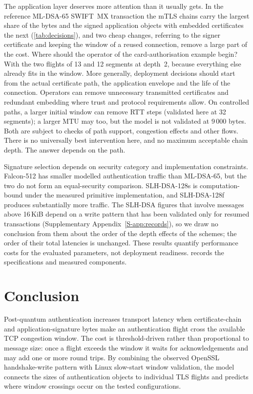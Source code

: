 \documentclass[preprint,12pt]{elsarticle}
\begin{document}
The application layer deserves more attention than it usually gets. In the reference ML-DSA-65 SWIFT~MX transaction the mTLS chains carry the largest share of the bytes and the signed application objects with embedded certificates the next (\cref{tab:decisions}), and two cheap changes, referring to the signer certificate and keeping the window of a reused connection, remove a large part of the cost. Where should the operator of the card-authorisation example begin? With the two flights of 13 and 12 segments at depth~2, because everything else already fits in the window. More generally, deployment decisions should start from the actual certificate path, the application envelope and the life of the connection. Operators can remove unnecessary transmitted certificates and redundant embedding where trust and protocol requirements allow. On controlled paths, a larger initial window can remove RTT steps (validated here at 32 segments); a larger MTU may too, but the model is not validated at 9\,000 bytes. Both are subject to checks of path support, congestion effects and other flows. There is no universally best intervention here, and no maximum acceptable chain depth. The answer depends on the path.

Signature selection depends on security category and implementation constraints. Falcon-512 has smaller modelled authentication traffic than ML-DSA-65, but the two do not form an equal-security comparison. SLH-DSA-128s is computation-bound under the measured primitive implementation, and SLH-DSA-128f produces substantially more traffic. The SLH-DSA figures that involve messages above 16\,KiB depend on a write pattern that has been validated only for resumed transactions (Supplementary Appendix~\ref{S-app:records}), so we draw no conclusion from them about the order of the depth effects of the schemes; the order of their total latencies is unchanged. These results quantify performance costs for the evaluated parameters, not deployment readiness.  records the specifications and measured components.

\section{Conclusion}
\label{sec:conclusion}

Post-quantum authentication increases transport latency when certificate-chain and application-signature bytes make an authentication flight cross the available TCP congestion window. The cost is threshold-driven rather than proportional to message size: once a flight exceeds the window it waits for acknowledgements and may add one or more round trips. By combining the observed OpenSSL handshake-write pattern with Linux slow-start window validation, the model connects the sizes of authentication objects to individual TLS flights and predicts where window crossings occur on the tested configurations.
\end{document}
